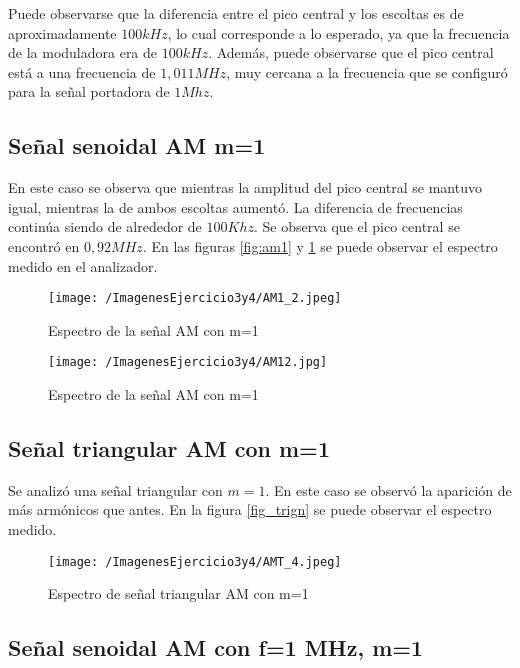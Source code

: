 Puede observarse que la diferencia entre el pico central y los escoltas es de aproximadamente $100 kHz$, lo cual corresponde a lo esperado, ya que la frecuencia de la moduladora era de $100 kHz$. Además, puede observarse que el pico central está a una frecuencia de $1,011 MHz$, muy cercana a la frecuencia que se configuró para la señal portadora de $1 Mhz$.

\subsection{Señal senoidal AM m=1}

En este caso se observa que mientras la amplitud del pico central se mantuvo igual, mientras la de ambos escoltas aumentó. La diferencia de frecuencias continúa siendo de alrededor de $100 Khz$. Se observa que el pico central se encontró en $0,92 MHz$. En las figuras \ref{fig:am1} y \ref{fig:am2} se puede observar el espectro medido en el analizador.

\begin{figure}[H]
  \centering
  \begin{minipage}[b]{0.6\textwidth}
    \texttt{[image: /ImagenesEjercicio3y4/AM1\_2.jpeg]}
    \caption{Espectro de la señal AM con m=1}
    \label{fig:am1}
  \end{minipage}
  \hfill
  \begin{minipage}[b]{0.6\textwidth}
    \texttt{[image: /ImagenesEjercicio3y4/AM12.jpg]}
    \caption{Espectro de la señal AM con m=1}
    \label{fig:am2}
  \end{minipage}
\end{figure}

\subsection{Señal triangular AM con m=1}
Se analizó una señal triangular con $m=1$. En este caso se observó la aparición de más armónicos que antes. En la figura \ref{fig_trign} se puede observar el espectro medido.

\begin{figure}[H]
	\centering
	\texttt{[image: /ImagenesEjercicio3y4/AMT\_4.jpeg]}
\caption{Espectro de señal triangular AM con m=1}
	\label{fig:trign}
\end{figure}

\subsection{Señal senoidal AM con f=1 MHz, m=1 }

